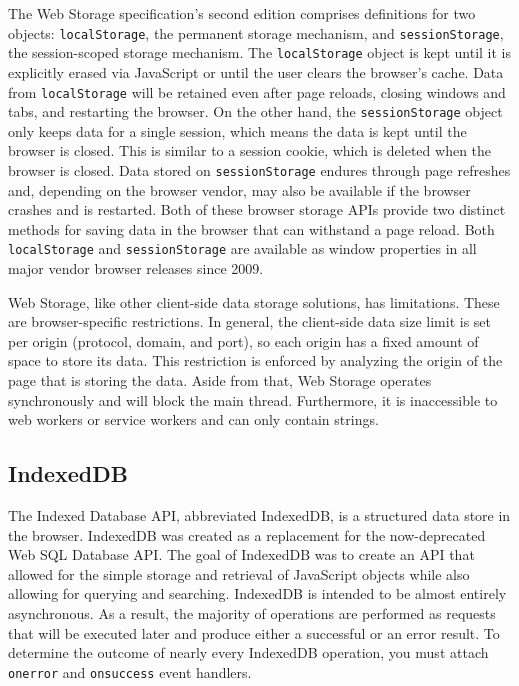 The Web Storage specification's second edition comprises definitions for two objects: \verb;localStorage;, the permanent storage mechanism, and \verb;sessionStorage;, the session-scoped storage mechanism. The \verb;localStorage; object is kept until it is explicitly erased via JavaScript or until the user clears the browser's cache. Data from \verb;localStorage; will be retained even after page reloads, closing windows and tabs, and restarting the browser. On the other hand, the \verb;sessionStorage; object only keeps data for a single session, which means the data is kept until the browser is closed. This is similar to a session cookie, which is deleted when the browser is closed. Data stored on \verb;sessionStorage; endures through page refreshes and, depending on the browser vendor, may also be available if the browser crashes and is restarted. Both of these browser storage APIs provide two distinct methods for saving data in the browser that can withstand a page reload. Both \verb;localStorage; and \verb;sessionStorage; are available as window properties in all major vendor browser releases since 2009.

Web Storage, like other client-side data storage solutions, has limitations. These are browser-specific restrictions. In general, the client-side data size limit is set per origin (protocol, domain, and port), so each origin has a fixed amount of space to store its data. This restriction is enforced by analyzing the origin of the page that is storing the data. Aside from that, Web Storage operates synchronously and will block the main thread. Furthermore, it is inaccessible to web workers or service workers and can only contain strings.

\subsection*{IndexedDB}
The Indexed Database API, abbreviated IndexedDB, is a structured data store in the browser. IndexedDB was created as a replacement for the now-deprecated Web SQL Database API. The goal of IndexedDB was to create an API that allowed for the simple storage and retrieval of JavaScript objects while also allowing for querying and searching. IndexedDB is intended to be almost entirely asynchronous. As a result, the majority of operations are performed as requests that will be executed later and produce either a successful or an error result. To determine the outcome of nearly every IndexedDB operation, you must attach \verb;onerror; and \verb;onsuccess; event handlers.

